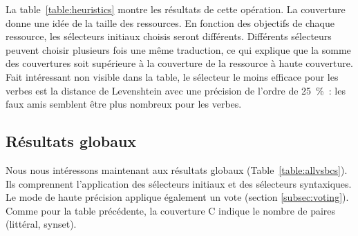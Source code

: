La table~\ref{table:heuristics} montre les résultats de cette opération. La
couverture donne une idée de la taille des ressources. En fonction des
objectifs de chaque ressource, les sélecteurs initiaux choisis seront
différents. Différents sélecteurs peuvent choisir plusieurs fois une même
traduction, ce qui explique que la somme des couvertures soit supérieure à la
couverture de la ressource à haute couverture. Fait intéressant non visible
dans la table, le sélecteur le moins efficace pour les verbes est la distance
de Levenshtein avec une précision de l'ordre de 25~\%~: les faux amis semblent
être plus nombreux pour les verbes.


\subsection{Résultats globaux}
\label{subsec:allvsbcs}

Nous nous intéressons maintenant aux résultats globaux
(Table~\ref{table:allvsbcs}). Ils comprennent l'application des sélecteurs
initiaux et des sélecteurs syntaxiques. Le mode de haute précision applique
également un vote (section \ref{subsec:voting}). Comme pour la table
précédente, la couverture C indique le nombre de paires (littéral, synset).

